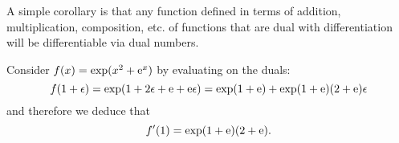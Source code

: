 A simple corollary is that any function defined in terms of addition, multiplication, composition, etc. of functions that are dual with differentiation will be differentiable via dual numbers.

\begin{example}

Consider $f(x) =  \exp(x^2 + {\rm e}^x)$ by evaluating on the duals:
\[
f(1 + \epsilon) = \exp(1 + 2\epsilon + {\rm e} + {\rm e} \epsilon) =  \exp(1 + {\rm e}) + \exp(1 + {\rm e}) (2 + {\rm e}) \epsilon
\]
and therefore we deduce that
\[
f'(1) = \exp(1 + {\rm e}) (2 + {\rm e}).
\]
\end{example}



